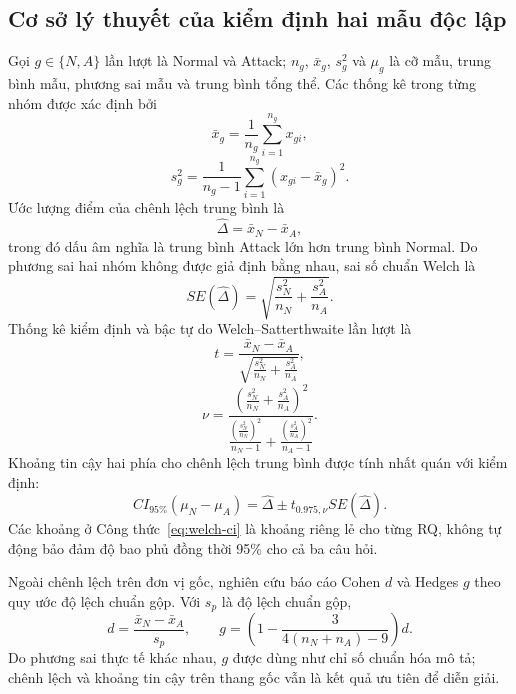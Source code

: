 \subsection{Cơ sở lý thuyết của kiểm định hai mẫu độc lập}
\label{subsec:two-sample-theory}

Gọi $g\in\{N,A\}$ lần lượt là Normal và Attack; $n_g$, $\bar{x}_g$, $s_g^2$ và
$\mu_g$ là cỡ mẫu, trung bình mẫu, phương sai mẫu và trung bình tổng thể. Các thống
kê trong từng nhóm được xác định bởi
\begin{equation}
  \bar{x}_g=\frac{1}{n_g}\sum_{i=1}^{n_g}x_{gi},
  \label{eq:two-sample-mean}
\end{equation}
\begin{equation}
  s_g^2=\frac{1}{n_g-1}\sum_{i=1}^{n_g}(x_{gi}-\bar{x}_g)^2.
  \label{eq:two-sample-variance}
\end{equation}
Ước lượng điểm của chênh lệch trung bình là
\begin{equation}
  \widehat{\Delta}=\bar{x}_N-\bar{x}_A,
  \label{eq:two-sample-difference}
\end{equation}
trong đó dấu âm nghĩa là trung bình Attack lớn hơn trung bình Normal. Do phương sai
hai nhóm không được giả định bằng nhau, sai số chuẩn Welch là
\begin{equation}
  SE(\widehat{\Delta})=
  \sqrt{\frac{s_N^2}{n_N}+\frac{s_A^2}{n_A}}.
  \label{eq:welch-se}
\end{equation}
Thống kê kiểm định và bậc tự do Welch--Satterthwaite lần lượt là
\begin{equation}
  t=\frac{\bar{x}_N-\bar{x}_A}
  {\sqrt{\frac{s_N^2}{n_N}+\frac{s_A^2}{n_A}}},
  \label{eq:welch-t}
\end{equation}
\begin{equation}
  \nu=
  \frac{\left(\frac{s_N^2}{n_N}+\frac{s_A^2}{n_A}\right)^2}
  {\frac{\left(\frac{s_N^2}{n_N}\right)^2}{n_N-1}
  +\frac{\left(\frac{s_A^2}{n_A}\right)^2}{n_A-1}}.
  \label{eq:welch-df}
\end{equation}
Khoảng tin cậy hai phía cho chênh lệch trung bình được tính nhất quán với kiểm định:
\begin{equation}
  CI_{95\%}(\mu_N-\mu_A)=
  \widehat{\Delta}\pm t_{0.975,\nu}SE(\widehat{\Delta}).
  \label{eq:welch-ci}
\end{equation}
Các khoảng ở Công thức~\eqref{eq:welch-ci} là khoảng riêng lẻ cho từng RQ, không tự
động bảo đảm độ bao phủ đồng thời 95\% cho cả ba câu hỏi.

Ngoài chênh lệch trên đơn vị gốc, nghiên cứu báo cáo Cohen $d$ và Hedges $g$ theo quy
ước độ lệch chuẩn gộp. Với $s_p$ là độ lệch chuẩn gộp,
\begin{equation}
  d=\frac{\bar{x}_N-\bar{x}_A}{s_p},\qquad
  g=\left(1-\frac{3}{4(n_N+n_A)-9}\right)d.
  \label{eq:hedges-g}
\end{equation}
Do phương sai thực tế khác nhau, $g$ được dùng như chỉ số chuẩn hóa mô tả; chênh lệch
và khoảng tin cậy trên thang gốc vẫn là kết quả ưu tiên để diễn giải.

